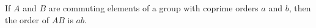 If $A$ and $B$ are commuting elements of a group with coprime orders $a$ and $b$, then the order of $AB$ is $ab$.
